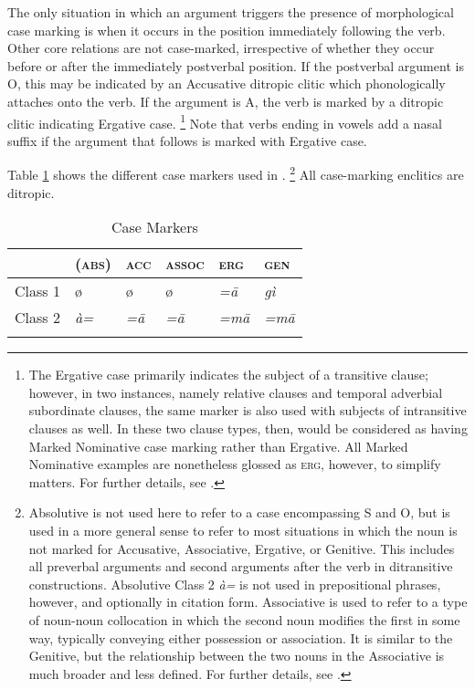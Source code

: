 \documentclass[output=collectionpaper,hidelinks]{langscibook}
\theoremstyle{remark}
\begin{document}
The only situation in which an argument triggers the presence of morphological case marking is when it occurs in the position immediately following the verb. Other core relations are not
case-marked, irrespective of whether they occur before or after the immediately
postverbal position. If the postverbal argument is O, this may be indicated
by an Accusative ditropic clitic which phonologically attaches onto the verb.
If the argument is A, the verb is marked by a ditropic clitic indicating Ergative
case.%
\footnote{The Ergative case primarily indicates the subject of a transitive
clause; however, in two instances, namely relative clauses and temporal
adverbial subordinate clauses, the same marker is also used with subjects of
intransitive clauses as well. In these two clause types, then,  would be
considered as having Marked Nominative case marking rather than Ergative. All
Marked Nominative examples are nonetheless glossed as \textsc{erg}, however, to
simplify matters. For further details, see \citet{Killian2015}.} %
Note
that verbs ending in vowels add a nasal suffix if the argument that follows is
marked with Ergative case.

Table \ref{tab:Don:case_markers} shows the different case markers used in
.%
\footnote{Absolutive is not used here to refer to a case encompassing S and O,
but is used in a more general sense to refer to most situations in which the
noun is not marked for Accusative, Associative, Ergative, or Genitive.  This
includes all preverbal arguments and second arguments after the verb in
ditransitive constructions.  Absolutive Class 2 \emph{à=} is not used in
prepositional phrases, however, and optionally in citation form.  Associative is
used to refer to a type of noun-noun collocation in which the second noun
modifies the first in some way, typically conveying either possession or
association.  It is similar to the Genitive, but the relationship between the
two nouns in the Associative is much broader and less defined.  For further
details, see \citet{Killian2015}.} %
All case-marking enclitics are ditropic.

\begin{table}[h!]
\centering
\caption{Case Markers}
\label{tab:Don:case_markers}
\begin{tabularx}{.7\textwidth}{lXXXXX}
\lsptoprule
& (\textsc{abs}) & \textsc{acc} & \textsc{assoc} & \textsc{erg} & \textsc{gen} \\
\midrule
Class 1 & ø & ø & ø & \itshape  =ā & \itshape  gì \\
Class 2 &  \itshape à= & \itshape  =ā &  \itshape =ā &  \itshape =mā & \itshape  =mā \\
\lspbottomrule
\end{tabularx}
\end{table}
\end{document}
